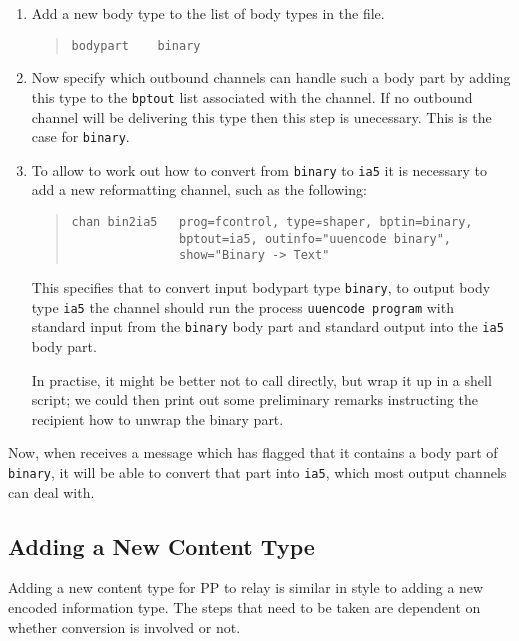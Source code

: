 \begin{enumerate}
\item	Add a new body type to the list of body types in the
 file.
\begin{quote}\small\begin{verbatim}
bodypart    binary
\end{verbatim}\end{quote}

\item	Now specify which outbound channels can handle such a body
part by adding this type to the \verb|bptout| list
associated with the channel. If no outbound channel will be delivering
this type then this step is unecessary. This is the case for \verb|binary|.

\item	To allow  to work out how to convert from
\verb|binary| to \verb|ia5| it is necessary to add a new reformatting
channel, such as the following:
\begin{quote}\small\begin{verbatim}
chan bin2ia5   prog=fcontrol, type=shaper, bptin=binary,
               bptout=ia5, outinfo="uuencode binary",
               show="Binary -> Text"
\end{verbatim}\end{quote}
This specifies that to convert input bodypart type \verb|binary|, to output
body type \verb|ia5| the channel  should run the process
\verb|uuencode program| with standard input from the \verb|binary| body part
and standard output into the \verb|ia5| body part.

In practise, it might be better not to call  directly,
but wrap it up in a shell script; we could then print out some
preliminary remarks instructing the recipient how to unwrap the
binary part.

\end{enumerate}
Now, when  receives a message which has flagged that it
contains a body part of \verb|binary|, it will be able to convert that
part into \verb|ia5|, which most output channels can deal with.

\subsection{Adding a New Content Type}
Adding a new content type for PP to relay is similar in style to
adding a new encoded information type. The steps that need to be taken
are dependent on whether conversion is involved or not.

